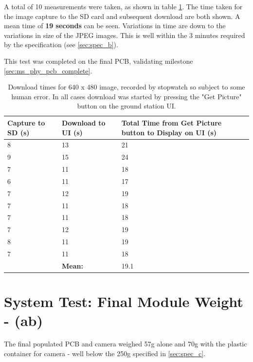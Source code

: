 A total of 10 measurements were taken, as shown in table \ref{table:download_time_test}.
The time taken for the image capture to the SD card and subsequent download are both
shown. A mean time of \textbf{19 seconds} can be seen. Variations in time are down to the
variations in size of the JPEG images. This is well within the 3 minutes required by the specification (see \ref{sec:spec_b}).

This test was completed on the final PCB, validating milestone \ref{sec:ms_phy_pcb_complete}.

\begin{table}[!hbtp]

	\centering
	\begin{tabular}{ | p{3cm} | p{3cm} | p{4cm} | }
	\hline
	\textbf{Capture to SD (s)} & \textbf{Download to UI (s)} & 
	\textbf{Total Time from Get Picture button to Display on UI (s)} \\ \hline

	8 & 13  & 21 \\ \hline
	9 & 15  & 24 \\ \hline
	7 & 11  & 18 \\ \hline
	6 & 11  & 17 \\ \hline
	7 & 12  & 19 \\ \hline
	7 & 11  & 18 \\ \hline
	7 & 11  & 18 \\ \hline
	7 & 12  & 19 \\ \hline
	8 & 11  & 19 \\ \hline
	7 & 11  & 18 \\ \hline
	 & \textbf{Mean:} & 19.1 \\ \hline

	\end{tabular}
	\caption{Download times for 640 x 480 image, recorded by stopwatch so subject to some human error. In all cases download was started by pressing the "Get Picture" button on the ground station UI.}
	\label{table:download_time_test}
\end{table}

\section{System Test: Final Module Weight - (ab)}
\label{sec:sys_weight}
The final populated PCB and camera weighed 57g alone and 70g with the plastic container for 
camera - well below the 250g specified in \ref{sec:spec_c}.




